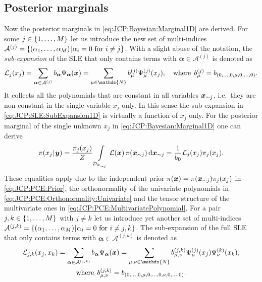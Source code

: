 \subsection{Posterior marginals}
Now the posterior marginals in \cref{eq:JCP:Bayesian:Marginal1D} are derived.
For some \(j \in \{1,\ldots,M\}\) let us introduce the new set of multi-indices \(\mathcal{A}^{(j)} = \{(\alpha_1,\ldots,\alpha_M) {\:\!}|{\:\!} \alpha_i = 0 \text{ for } i \neq j\}\).
With a slight abuse of the notation, the \emph{sub-expansion} of the SLE that only contains terms with \(\bm{\alpha} \in \mathcal{A}^{(j)}\) is denoted as
\begin{equation} \label{eq:JCP:SLE:SubExpansion1D}
  \mathcal{L}_j(x_j)
  = \sum\limits_{\bm{\alpha} \in \mathcal{A}^{(j)}} \coeffL_{\bm{\alpha}} \basis_{\bm{\alpha}}(\bm{x})
  = \sum\limits_{\mu \in \mathds{N}} \coeffL^{(j)}_{\mu} \basis_{\mu}^{(j)}(x_j),
  \quad \text{where} \;\, \coeffL^{(j)}_{\mu} = \coeffL_{(0,\ldots,0,\mu,0,\ldots,0)}.
\end{equation}
It collects all the polynomials that are constant in all variables \(\bm{x}_{\sim j}\), i.e.\ they are non-constant in the single variable \(x_j\) only.
In this sense the sub-expansion in \cref{eq:JCP:SLE:SubExpansion1D} is virtually a function of \(x_j\) only.
For the posterior marginal of the single unknown \(x_j\) in \cref{eq:JCP:Bayesian:Marginal1D} one can derive
\begin{equation} \label{eq:JCP:SLE:Marginal1D}
  \pi(x_j {\:\!}|{\:\!} \bm{y})
  = \frac{\pi_j(x_j)}{Z} \int\limits_{\mathcal{D}_{\bm{x}_{\sim j}}} \mathcal{L}(\bm{x}) \, \pi(\bm{x}_{\sim j}) \, \mathrm{d} \bm{x}_{\sim j}
  = \frac{1}{b_{\bm{0}}} \mathcal{L}_j(x_j) \pi_j(x_j).
\end{equation}
These equalities apply due to the independent prior \(\pi(\bm{x}) = \pi(\bm{x}_{\sim j}) \pi_j(x_j)\) in \cref{eq:JCP:PCE:Prior},
the orthonormality of the univariate polynomials in \cref{eq:JCP:PCE:Orthonormality:Univariate} and the tensor structure of the multivariate ones in \cref{eq:JCP:PCE:MultivariatePolynomial}.
For a pair \(j,k \in \{1,\ldots,M\}\) with \(j \neq k\) let us introduce yet another set of multi-indices
\(\mathcal{A}^{(j,k)} = \{(\alpha_1,\ldots,\alpha_M) {\:\!}|{\:\!} \alpha_i = 0 \text{ for } i \neq j,k\}\).
The sub-expansion of the full SLE that only contains terms with \(\bm{\alpha} \in \mathcal{A}^{(j,k)}\) is denoted as
\begin{equation} \label{eq:JCP:SLE:SubExpansion2D}
  \begin{gathered}
  \mathcal{L}_{j,k}(x_j,x_k)
  = \sum\limits_{\bm{\alpha} \in \mathcal{A}^{(j,k)}} \coeffL_{\bm{\alpha}} \basis_{\bm{\alpha}}(\bm{x})
  = \sum\limits_{\mu,\nu \in \mathds{N}} \coeffL^{(j,k)}_{\mu,\nu} \basis_{\mu}^{(j)}(x_j) \basis_{\nu}^{(k)}(x_k), \\
  \text{where} \;\, \coeffL^{(j,k)}_{\mu,\nu} = \coeffL_{(0,\ldots,0,\mu,0,\ldots,0,\nu,0,\ldots,0)}.
  \end{gathered}
\end{equation}
